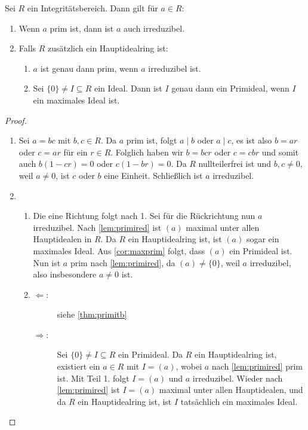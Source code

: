 \documentclass[12pt,a4paper]{scrartcl}
\begin{document}
\begin{satz} \label{thm:primirred_intb} Sei $R$ ein Integritätsbereich. Dann gilt für $a\in R$: \begin{enumerate}
		\item Wenn $a$ prim ist, dann ist $a$ auch irreduzibel.
		\item Falls $R$ zusätzlich ein Hauptidealring ist:
		\begin{enumerate}
			\item $a$ ist genau dann prim, wenn $a$ irreduzibel ist.
			\item Sei $\{0\}\neq I\subseteq R$ ein Ideal. Dann ist $I$ genau dann ein Primideal, wenn $I$ ein maximales Ideal ist.
		\end{enumerate}
	\end{enumerate}
\end{satz}
\begin{proof}
	\leavevmode
	\begin{enumerate}
		\item Sei $a = bc$ mit $b,c \in R$. Da $a$ prim ist, folgt $a\mid b$ oder $a \mid c$, es ist also $b = ar$ oder $c = ar$ für ein $r\in R$.  Folglich haben wir $b = bcr$ oder $c = cbr$ und somit auch $b(1-cr)=0$ oder $c(1-br)=0$. Da $R$ nullteilerfrei ist und $b,c \neq 0$, weil $a \neq 0$, ist $c$ oder $b$ eine Einheit. Schließlich ist $a$ irreduzibel.
		
		\item \begin{enumerate}
			\item Die eine Richtung folgt nach 1. Sei für die Rückrichtung nun $a$ irreduzibel. Nach \cref{lem:primired} ist $(a)$ maximal unter allen Hauptidealen in $R$. Da $R$ ein Hauptidealring ist, ist $(a)$ sogar ein maximales Ideal. Aus \cref{cor:maxprim} folgt, dass $(a)$ ein Primideal ist. Nun ist $a$ prim nach \cref{lem:primired}, da $(a)\neq\{0\}$, weil $a$ irreduzibel, also insbesondere $a\neq 0$ ist.
			
			\item \begin{description}
					\item[\glqq$\Leftarrow$\grqq:] siehe \cref{thm:primitb}
					\item[\glqq$\Rightarrow$\grqq:] Sei $\{0\}\neq I\subseteq R$ ein Primideal. Da $R$ ein Hauptidealring ist, existiert ein $a\in R$ mit $I = (a)$, wobei $a$ nach \cref{lem:primired} prim ist. Mit Teil 1. folgt $I = (a)$ und $a$ irreduzibel. Wieder nach \cref{lem:primired} ist $I = (a) $ maximal unter allen Hauptidealen, und da $R$ ein Hauptidealring ist, ist $I$ tatsächlich ein maximales Ideal.
					\qedhere
					\end{description}
			\end{enumerate}
	\end{enumerate}
\end{proof}
\end{document}
